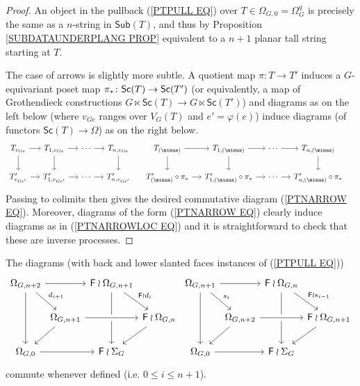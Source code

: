 \documentclass[a4paper,10pt]{article}%
\begin{document}
\begin{proof}
	An object in the pullback (\ref{PTPULL EQ}) over 
	$T\in \Omega_{G,0} = \Omega_G^q$ is precisely the same as a $n$-string in $\mathsf{Sub}(T)$, and thus by Proposition \ref{SUBDATAUNDERPLANG PROP} equivalent to a $n+1$ planar tall string starting at $T$.
	
	The case of arrows is slightly more subtle. A quotient map $\pi \colon T \to T'$ induces a $G$-equivariant poset map 
	$\pi_{\**} \colon \mathsf{Sc}(T) \to \mathsf{Sc}(T')$ 
	(or equivalently, a map of Grothendieck constructions 
	$G \ltimes \mathsf{Sc}(T) \to G \ltimes \mathsf{Sc}(T')$)
	and diagrams as on the left below (where $v_{Ge}$ ranges over $V_G(T)$ and $e'=\varphi(e)$) induce diagrams (of functors $\mathsf{Sc}(T) \to \Omega$) as on the right below.
	\begin{equation} \label{PTNARROWLOC EQ}
	\begin{tikzcd}[column sep=1.2em]
	T_{v_{G e}} \ar{r}{} \ar{d}[swap]{} & 
	T_{1,v_{G e}} \ar{r}{} \ar{d}[swap]{} &
	\cdots \ar{r}{} &
	T_{n,v_{G e}} \ar{d}{} &
	T_{(\minus)} \ar{r}{} \ar{d}[swap]{} & 
	T_{1,(\minus)} \ar{r}{} \ar{d}[swap]{} &
	\cdots \ar{r}{} &
	T_{n,(\minus)} \ar{d}{} &
\\
	T'_{v_{G e'}} \ar{r}{} &
	T'_{1,v_{G e'}} \ar{r}{} &
	\cdots \ar{r}{} &
	T'_{n,v_{G e'}} &
	T'_{(\minus)}\circ \pi_{\**} \ar{r}{} &
	T'_{1,(\minus)}\circ \pi_{\**} \ar{r}{} &
	\cdots \ar{r}{} &
	T'_{n,(\minus)}\circ \pi_{\**} &
	\end{tikzcd}	
	\end{equation}
Passing to colimits then gives the desired commutative diagram (\ref{PTNARROW EQ}). Moreover, diagrams of the form (\ref{PTNARROW EQ}) clearly induce diagrams as in  (\ref{PTNARROWLOC EQ}) and it is straightforward to check that these are inverse processes. 
\end{proof}


\begin{remark}\label{DSCOM REM}
The diagrams (with back and lower slanted faces instances of (\ref{PTPULL EQ}))
	\[
	\begin{tikzcd}[column sep = 0.1em]
		\Omega_{G,{n+2}} \ar{rr} \ar{rd}{d_{i+1}} \ar{dd}
		 & & \Fin \wr \Omega_{G,{n+1}} \ar{rd}{\Fin \wr d_i} \ar{dd} & &
		\Omega_{G,{n+1}} \ar{rr} \ar{rd}{s_{i}} \ar{dd} 
		& & \Fin \wr \Omega_{G,{n}} \ar{rd}{\Fin \wr s_{i-1}} \ar{dd} &
	\\
		& \Omega_{G,{n+1}} \ar{ld} \ar[crossing over]{rr} 
		& & \Fin \wr \Omega_{G,{n}} \ar{ld} &
		& \Omega_{G,{n+2}} \ar{ld} \ar[crossing over]{rr} 
		& & \Fin \wr \Omega_{G,{n+1}} \ar{ld}
	\\
		 \Omega_{G,0} \ar{rr} & & \Fin \wr \Sigma_G & &
		 \Omega_{G,0} \ar{rr} & & \Fin \wr \Sigma_G &
	\end{tikzcd}
	\]
commute whenever defined (i.e. $0 \leq i \leq n+1$).
\end{remark}
\end{document}
